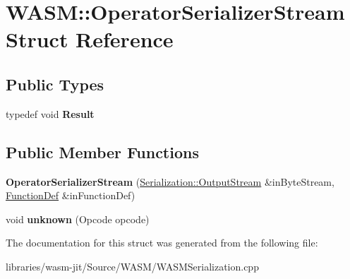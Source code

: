 \hypertarget{struct_w_a_s_m_1_1_operator_serializer_stream}{}\section{W\+A\+SM\+:\+:Operator\+Serializer\+Stream Struct Reference}
\label{struct_w_a_s_m_1_1_operator_serializer_stream}
\subsection*{Public Types}
\begin{DoxyCompactItemize}
\item 
\mbox{\label{struct_w_a_s_m_1_1_operator_serializer_stream_acba56ea2c13a0283125e4a89efd48a33}} 
typedef void {\bfseries Result}
\end{DoxyCompactItemize}
\subsection*{Public Member Functions}
\begin{DoxyCompactItemize}
\item 
\mbox{\label{struct_w_a_s_m_1_1_operator_serializer_stream_a5a7d2c973f3da20f91303c66c7c7cf69}} 
{\bfseries Operator\+Serializer\+Stream} (\mbox{\hyperlink{struct_serialization_1_1_output_stream}{Serialization\+::\+Output\+Stream}} \&in\+Byte\+Stream, \mbox{\hyperlink{struct_i_r_1_1_function_def}{Function\+Def}} \&in\+Function\+Def)
\item 
\mbox{\label{struct_w_a_s_m_1_1_operator_serializer_stream_aeabb0aa581b4f0236ec7b35e6ee1aaa8}} 
void {\bfseries unknown} (Opcode opcode)
\end{DoxyCompactItemize}


The documentation for this struct was generated from the following file\+:\begin{DoxyCompactItemize}
\item 
libraries/wasm-\/jit/\+Source/\+W\+A\+S\+M/W\+A\+S\+M\+Serialization.\+cpp\end{DoxyCompactItemize}
